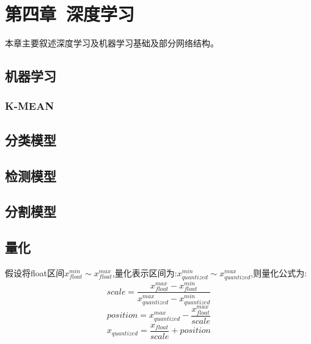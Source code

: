 \documentclass[12pt]{book}
\begin{document}
\fancyhead{}

\chapter{第四章\ 深度学习}
本章主要叙述深度学习及机器学习基础及部分网络结构。

\section{机器学习}
\subsection{K-MEAN}
\section{分类模型}
\section{检测模型}
\section{分割模型}
\section{量化}
假设将float区间$x_{float}^{min}\sim x_{float}^{max}$,量化表示区间为:$x_{quantized}^{min}\sim x_{quantized}^{max}$,则量化公式为:
\[scale = \frac{x_{float}^{max} - x_{float}^{min}}{x_{quantized}^{max} - x_{quantized}^{min}}\]
\[position = x_{quantized}^{max} - \frac{x_{float}^{max}}{scale}\]
\[x_{quantized} = \frac{x_{float}}{scale} + position\]
\end{document}
